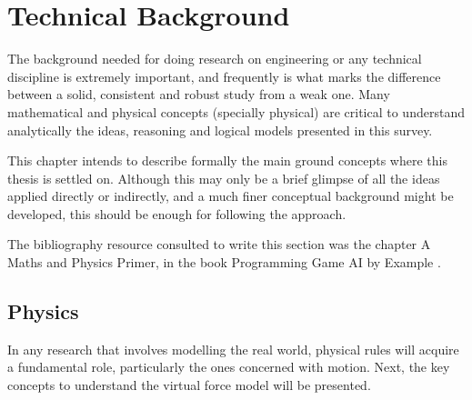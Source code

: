 \ifx\isEmbedded\undefined

\graphicspath{{../img/}}

\fi

\chapter{Technical Background}
\label{chap:technical_background}

The background needed for doing research on engineering or any technical discipline is extremely important, and frequently is what marks the difference between a solid, consistent and robust study from a weak one. Many mathematical and physical concepts (specially physical) are critical to understand analytically the ideas, reasoning and logical models presented in this survey.

This chapter intends to describe formally the main ground concepts where this thesis is settled on. Although this may only be a brief glimpse of all the ideas applied directly or indirectly, and a much finer conceptual background might be developed, this should be enough for following the approach.

The bibliography resource consulted to write this section was the chapter A Maths and Physics Primer, in the book Programming Game AI by Example \citep{buckland}.

\section{Physics}

In any research that involves modelling the real world, physical rules will acquire a fundamental role, particularly the ones concerned with motion. Next, the key concepts to understand the virtual force model will be presented.

